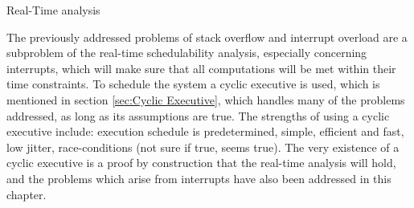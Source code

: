 Real-Time analysis 

The previously addressed problems of stack overflow and interrupt overload are a subproblem of the real-time schedulability analysis, especially concerning interrupts, which will make sure that all computations will be met within their time constraints. 
To schedule the system a cyclic executive is used, which is mentioned in section \ref{sec:Cyclic Executive}, which handles many of the problems addressed, as long as its assumptions are true. 
The strengths of using a cyclic executive include: execution schedule is predetermined, simple, efficient and fast, low jitter, race-conditions (not sure if true, seems true). 
The very existence of a cyclic executive is a proof by construction that the real-time analysis will hold, and the problems which arise from interrupts have also been addressed in this chapter.